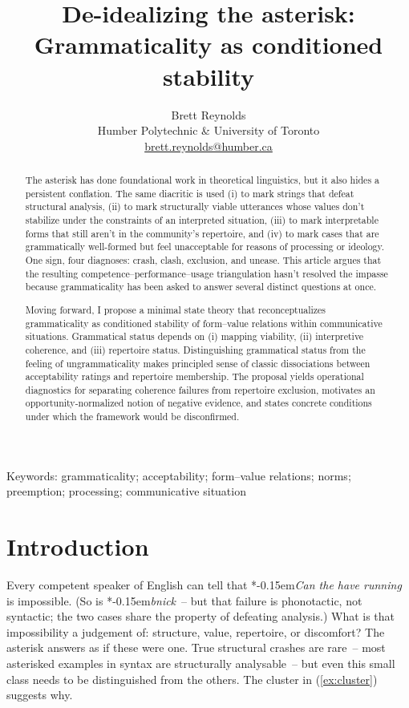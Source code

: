 \documentclass[12pt,letterpaper]{article}
\title{De-idealizing the asterisk:\\Grammaticality as conditioned stability}
\author{Brett Reynolds \orcidlink{0000-0003-0073-7195}\\Humber Polytechnic \& University of Toronto\\\href{mailto:brett.reynolds@humber.ca}{brett.reynolds@humber.ca}}
\date{}
\newcommand{\mention}[1]{\textit{#1}}
\newcommand{\judgesep}{\kern-0.15em}
\newcommand{\ungram}[1]{*\judgesep#1}
\begin{document}
\maketitle

\begin{abstract}
The asterisk has done foundational work in theoretical linguistics, but it also hides a persistent conflation. The same diacritic is used (i) to mark strings that defeat structural analysis, (ii) to mark structurally viable utterances whose values don't stabilize under the constraints of an interpreted situation, (iii) to mark interpretable forms that still aren't in the community's repertoire, and (iv) to mark cases that are grammatically well-formed but feel unacceptable for reasons of processing or ideology. One sign, four diagnoses: crash, clash, exclusion, and unease. This article argues that the resulting competence--performance--usage triangulation hasn't resolved the impasse because grammaticality has been asked to answer several distinct questions at once.

Moving forward, I propose a minimal state theory that reconceptualizes grammaticality as conditioned stability of form--value relations within communicative situations. Grammatical status depends on (i) mapping viability, (ii) interpretive coherence, and (iii) repertoire status. Distinguishing grammatical status from the feeling of ungrammaticality makes principled sense of classic dissociations between acceptability ratings and repertoire membership. The proposal yields operational diagnostics for separating coherence failures from repertoire exclusion, motivates an opportunity-normalized notion of negative evidence, and states concrete conditions under which the framework would be disconfirmed.
\end{abstract}

\noindent Keywords: grammaticality; acceptability; form--value relations; norms; preemption; processing; communicative situation

\section{Introduction}

Every competent speaker of English can tell that \ungram{\mention{Can the have running}} is impossible. (So is \ungram{\mention{bnick}}~-- but that failure is phonotactic, not syntactic; the two cases share the property of defeating analysis.) What is that impossibility a judgement of: structure, value, repertoire, or discomfort? The asterisk answers as if these were one. True structural crashes are rare~-- most asterisked examples in syntax are structurally analysable~-- but even this small class needs to be distinguished from the others. The cluster in (\ref{ex:cluster}) suggests why.
\end{document}
